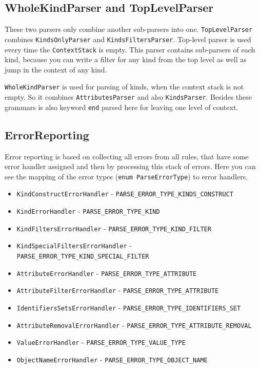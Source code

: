 \documentclass[deska]{subfiles}
\begin{document}
\subsection{WholeKindParser and TopLevelParser}

These two parsers only combine another sub-parsers into one. {\tt TopLevelParser} combines {\tt KindsOnlyParser} and
{\tt KindsFiltersParser}. Top-level parser is used every time the {\tt ContextStack} is empty. This parser contains sub-parsers
of each kind, because you can write a filter for any kind from the top level as well as jump in the context of any kind.

{\tt WholeKindParser} is used for parsing of kinds, when the context stack is not empty. So it combines {\tt AttributesParser}
and also {\tt KindsParser}. Besides these grammars is also keyword {\tt end} parsed here for leaving one level of context.

\subsection{ErrorReporting}

Error reporting is based on collecting all errors from all rules, that have some error handler assigned and then by
processing this stack of errors. Here you can see the mapping of the error types ({\tt enum ParseErrorType}) to
error handlers.

\begin{itemize}
    \item {\tt KindConstructErrorHandler} - {\tt PARSE\_ERROR\_TYPE\_KINDS\_CONSTRUCT}
    \item {\tt KindErrorHandler} - {\tt PARSE\_ERROR\_TYPE\_KIND}
    \item {\tt KindFiltersErrorHandler} - {\tt PARSE\_ERROR\_TYPE\_KIND\_FILTER}
    \item {\tt KindSpecialFiltersErrorHandler} - {\tt PARSE\_ERROR\_TYPE\_KIND\_SPECIAL\_FILTER}
    \item {\tt AttributeErrorHandler} - {\tt PARSE\_ERROR\_TYPE\_ATTRIBUTE}
    \item {\tt AttributeFilterErrorHandler} - {\tt PARSE\_ERROR\_TYPE\_ATTRIBUTE}
    \item {\tt IdentifiersSetsErrorHandler} - {\tt PARSE\_ERROR\_TYPE\_IDENTIFIERS\_SET}
    \item {\tt AttributeRemovalErrorHandler} - {\tt PARSE\_ERROR\_TYPE\_ATTRIBUTE\_REMOVAL}
    \item {\tt ValueErrorHandler} - {\tt PARSE\_ERROR\_TYPE\_VALUE\_TYPE}
    \item {\tt ObjectNameErrorHandler} - {\tt PARSE\_ERROR\_TYPE\_OBJECT\_NAME}
\end{itemize}
\end{document}
